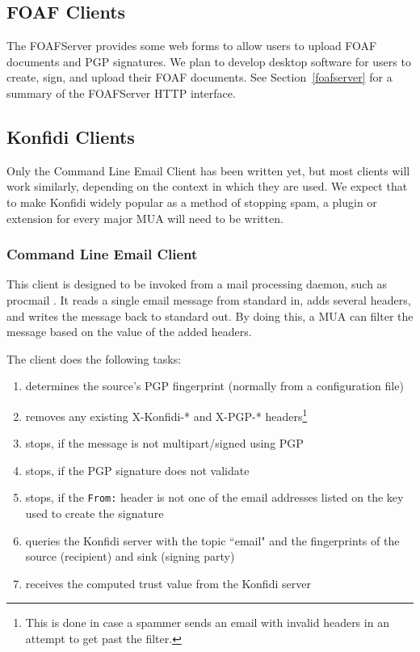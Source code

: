 \documentclass{acm_proc_article-sp}
\begin{document}
\subsection{FOAF Clients}
The FOAFServer provides some web forms to allow users to upload FOAF documents and PGP signatures.  We plan to develop desktop software for users to create, sign, and upload their FOAF documents.  See Section~\ref{foafserver} for a summary of the FOAFServer HTTP interface.

\subsection{Konfidi Clients}
Only the Command Line Email Client has been written yet, but most clients will work similarly, depending on the context in which they are used.  We expect that to make Konfidi widely popular as a method of stopping spam, a plugin or extension for every major MUA will need to be written.

\subsubsection{Command Line Email Client}
This client is designed to be invoked from a mail processing daemon, such as procmail \citep{procmail}.  It reads a single email message from standard in, adds several headers, and writes the message back to standard out.  By doing this, a MUA can filter the message based on the value of the added headers.

The client does the following tasks:
\begin{enumerate}
\item determines the source's PGP fingerprint (normally from a configuration file)
\item  removes any existing X-Konfidi-* and X-PGP-* headers\footnote{This is done in case a spammer sends an email with invalid headers in an attempt to get past the filter.}
\item  stops, if the message is not multipart/signed using PGP
\item  stops, if the PGP signature does not validate
\item  stops, if the \texttt{From:} header is not one of the email addresses listed on the key used to create the signature
\item  queries the Konfidi server with the topic ``email" and the fingerprints of the source (recipient) and sink (signing party)
\item  receives the computed trust value from the Konfidi server
\end{enumerate}
\end{document}
